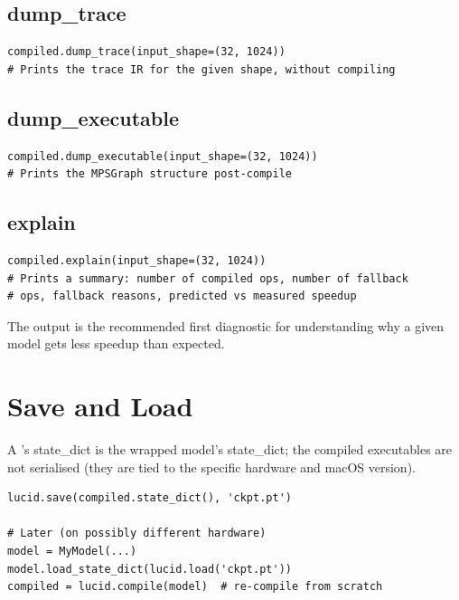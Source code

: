 \subsection{dump\_trace}
\label{ssec:compiled_module:dump_trace}

\begin{lstlisting}[style=lucid,language=LucidPython]
compiled.dump_trace(input_shape=(32, 1024))
# Prints the trace IR for the given shape, without compiling
\end{lstlisting}

\subsection{dump\_executable}
\label{ssec:compiled_module:dump_executable}

\begin{lstlisting}[style=lucid,language=LucidPython]
compiled.dump_executable(input_shape=(32, 1024))
# Prints the MPSGraph structure post-compile
\end{lstlisting}

\subsection{explain}
\label{ssec:compiled_module:explain}

\begin{lstlisting}[style=lucid,language=LucidPython]
compiled.explain(input_shape=(32, 1024))
# Prints a summary: number of compiled ops, number of fallback
# ops, fallback reasons, predicted vs measured speedup
\end{lstlisting}

The  output is the recommended first diagnostic
for understanding why a given model gets less speedup than
expected.

\section{Save and Load}
\label{sec:compiled_module:save_load}

A 's state\_dict is the wrapped model's
state\_dict; the compiled executables are not serialised (they
are tied to the specific hardware and macOS version).

\begin{lstlisting}[style=lucid,language=LucidPython]
lucid.save(compiled.state_dict(), 'ckpt.pt')

# Later (on possibly different hardware)
model = MyModel(...)
model.load_state_dict(lucid.load('ckpt.pt'))
compiled = lucid.compile(model)  # re-compile from scratch
\end{lstlisting}

